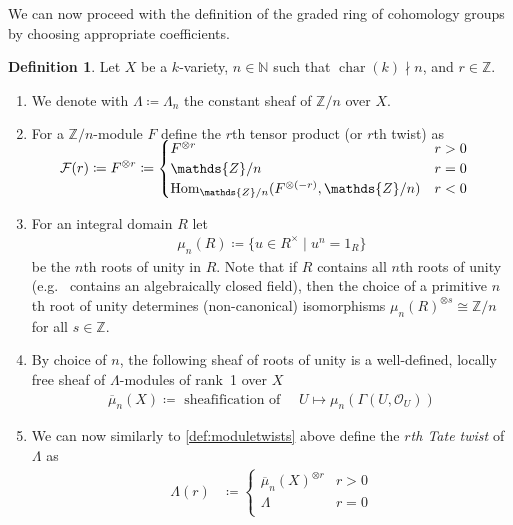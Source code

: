 \documentclass[english]{scrartcl}
\theoremstyle{definition}
\newtheorem{Def}{Definition}[section]
\theoremstyle{remark}
\newcommand*{\N}{\mathds{N}}
\newcommand*{\Z}{\mathds{Z}}
\newcommand*{\Zmod}[1]{\Z/#1} %
\newcommand*{\F}{\mathcal{F}} %
\DeclareMathOperator{\Char}{char} %
\DeclareMathOperator{\Hom}{Hom} %
\newcommand*{\forexample}{e.g.\ }
\begin{document}
We can now proceed with the definition of the graded ring of
cohomology groups by choosing appropriate coefficients.
\begin{Def}\label{def:coefficients}\cite[compare][p.~163]{milnebook}
  Let $X$ be a $k$-variety,
  $n\in\N$ such that $\Char(k)\nmid n$,
  and $r\in\Z$.
  \begin{enumerate}
  \item We denote with $\Lambda\coloneqq\Lambda_n$ the constant sheaf of
    $\Zmod{n}$ over $X$.
  \item\label{def:moduletwists}
    For a $\Zmod{n}$-module $F$ define the $r$th tensor product
    (or $r$th twist) as
    \begin{align*}
      \SwapAboveDisplaySkip
      \F(r)\coloneqq F^{\otimes r}
      &\coloneqq \begin{cases}
        F^{\otimes r} &r>0\\
        \Zmod{n} &r=0\\
        \Hom_{\Zmod{n}}(F^{\otimes (-r)},\Zmod{n}) &r<0
      \end{cases}
    \end{align*}
  \item\label{def:rootsofunity} For an integral domain $R$ let
    \begin{gather*}
      \mu_n(R)\coloneqq\{ u\in R^\times\;|\;u^n=1_R\}
    \end{gather*}
    be the $n$th roots of unity in $R$. 
    Note that if $R$ contains all $n$th roots of unity (\forexample
    contains an algebraically closed field), then the choice of a
    primitive $n$th root of unity determines (non-canonical) isomorphisms
    $\mu_n(R)^{\otimes s}\cong\Zmod{n}$ for all $s\in\Z$.
  \item By choice of $n$, the following sheaf of roots of unity is a
    well-defined, locally free sheaf of $\Lambda$-modules of rank~1
    over $X$
    \begin{gather*}
      \overline\mu_n(X) \coloneqq \text{ sheafification of }\quad
      U\mapsto \mu_n(\Gamma(U,\mathcal O_U))
    \end{gather*}
  \item\label{def:tatetwist}
    We can now similarly to \ref{def:moduletwists} above define the
    \emph{$r$th Tate twist} of $\Lambda$ as
    \begin{align*}
      \Lambda(r) &\coloneqq \begin{cases}
        \overline\mu_n(X)^{\otimes r} &r>0\\
        \Lambda &r=0\\

\end{cases}
\end{align*}
\end{enumerate}
\end{Def}
\end{document}

